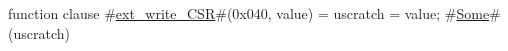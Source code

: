 function clause #\hyperref[sailRISCVzextzywritezyCSR]{ext\_write\_CSR}#(0x040, value) = { uscratch = value; #\hyperref[sailRISCVzSome]{Some}#(uscratch) }
